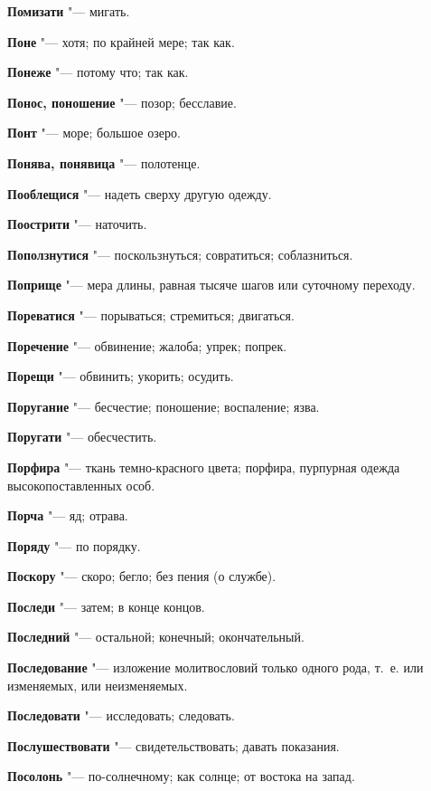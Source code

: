 \begin{mymulticols}
\noindent\textbf{Помизати} "--- мигать. 

\noindent\textbf{Поне} "--- хотя; по крайней мере; так как. 

\noindent\textbf{Понеже} "--- потому что; так как. 

\noindent\textbf{Понос, поношение} "--- позор; бесславие. 

\noindent\textbf{Понт} "--- море; большое озеро. 

\noindent\textbf{Понява, понявица} "--- полотенце. 

\noindent\textbf{Пооблещися} "--- надеть сверху другую одежду. 

\noindent\textbf{Поострити} "--- наточить. 

\noindent\textbf{Поползнутися} "--- поскользнуться; совратиться; соблазниться. 

\noindent\textbf{Поприще} "--- мера длины, равная тысяче шагов или суточному переходу. 

\noindent\textbf{Пореватися} "--- порываться; стремиться; двигаться. 

\noindent\textbf{Поречение} "--- обвинение; жалоба; упрек; попрек. 

\noindent\textbf{Порещи} "--- обвинить; укорить; осудить. 

\noindent\textbf{Поругание} "--- бесчестие; поношение; воспаление; язва. 

\noindent\textbf{Поругати} "--- обесчестить. 

\noindent\textbf{Порфира} "--- ткань темно-красного цвета; порфира, пурпурная одежда высокопоставленных особ. 

\noindent\textbf{Порча} "--- яд; отрава. 

\noindent\textbf{Поряду} "--- по порядку. 

\noindent\textbf{Поскору} "--- скоро; бегло; без пения (о службе). 

\noindent\textbf{Последи} "--- затем; в конце концов. 

\noindent\textbf{Последний} "--- остальной; конечный; окончательный. 

\noindent\textbf{Последование} "--- изложение молитвословий только одного рода, т.~е. или изменяемых, или неизменяемых. 

\noindent\textbf{Последовати} "--- исследовать; следовать. 

\noindent\textbf{Послушествовати} "--- свидетельствовать; давать показания. 

\noindent\textbf{Посолонь} "--- по-солнечному; как солнце; от востока на запад. 


\end{mymulticols}
